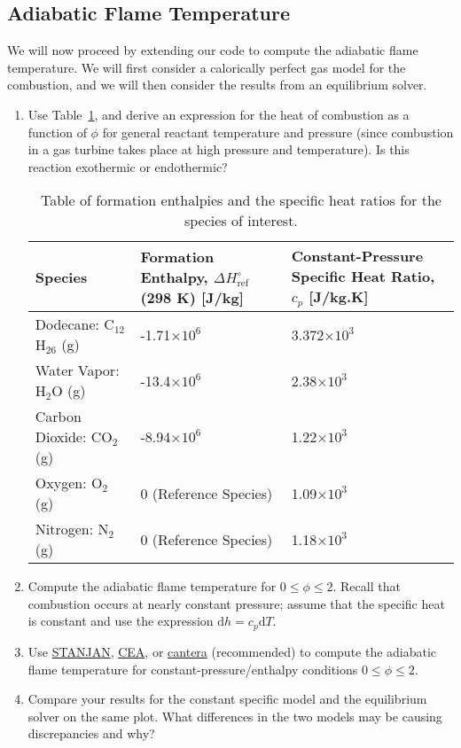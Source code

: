 \documentclass[11pt]{article}
\begin{document}
\subsection{Adiabatic Flame Temperature}
We will now proceed by extending our code to compute the adiabatic flame temperature.  We will first consider a calorically perfect gas model for the combustion, and we will then consider the results from an equilibrium solver.

\begin{enumerate}[label=(\alph*)]
	\item
    	Use Table~\ref{TAB_HEATS}, and derive an expression for the heat of combustion as a function of $\phi$ for general reactant temperature and pressure (since combustion in a gas turbine takes place at high pressure and temperature).  Is this reaction exothermic or endothermic?
        
        \begin{table}[!htb!]
        	\centering
        	\begin{tabular}{|p{}|p{}|p{}|}\hline
        Species & Formation Enthalpy, $\Delta H_\mathrm{ref}^\circ$(298 K) [J/kg]& Constant-Pressure Specific Heat Ratio, $c_p$ [J/kg.K] \\ \hline
        Dodecane: C$_{12}$H$_{26}$ (g) & -1.71$\times 10^6$ & 3.372$\times 10^3$ \\
        Water Vapor: H$_{2}$O (g) & -13.4$\times 10^6$ &  2.38$\times 10^3$\\
        Carbon Dioxide: CO$_{2}$ (g) & -8.94$\times 10^6$  & 1.22$\times 10^3$\\
        Oxygen: O$_{2}$ (g) & 0 (Reference Species) & 1.09$\times 10^3$\\
        Nitrogen: N$_{2}$ (g) & 0 (Reference Species) & 1.18$\times 10^3$\\
        \hline
        \end{tabular}
          \caption{\label{TAB_HEATS}Table of formation enthalpies and the specific heat ratios for the species of interest.}
          \end{table}
    \item
    	Compute the adiabatic flame temperature for $0 \le \phi \le 2$.  Recall that combustion occurs at nearly constant pressure; assume that the specific heat is constant and use the expression $\mathrm{d} h=c_p\mathrm{d}T$.
    \item
    	Use \href{http://navier.engr.colostate.edu/~dandy/code/code-4/}{STANJAN}, \href{https://cearun.grc.nasa.gov/}{CEA}, or \href{http://www.cantera.org/docs/sphinx/html/index.html}{cantera} (recommended) to compute the adiabatic flame temperature for constant-pressure/enthalpy conditions $0 \le \phi \le 2$.
    \item
    	Compare your results for the constant specific model and the equilibrium solver on the same plot. What differences in the two models may be causing discrepancies and why? 
\end{enumerate}	
\end{document}
